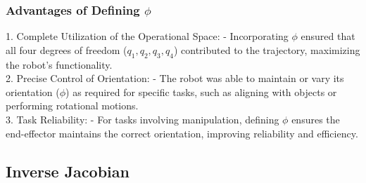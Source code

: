 \documentclass[12pt]{report}
\begin{document}
		\subsubsection{Advantages of Defining \(\phi\)}1. Complete Utilization of the Operational Space:
		- Incorporating \(\phi\) ensured that all four degrees of freedom (\(q_1, q_2, q_3, q_4\)) contributed to the trajectory, maximizing the robot’s functionality.\\2. Precise Control of Orientation:
		- The robot was able to maintain or vary its orientation (\(\phi\)) as required for specific tasks, such as aligning with objects or performing rotational motions.\\3. Task Reliability:
		- For tasks involving manipulation, defining \(\phi\) ensures the end-effector maintains the correct orientation, improving reliability and efficiency.
		
		\subsection{Inverse Jacobian}
\end{document}
